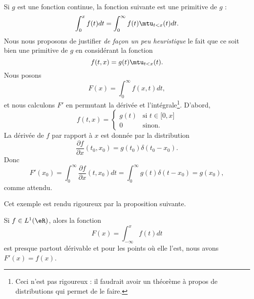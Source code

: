 \begin{example} \label{ExfYXeQg}
	Si \( g\) est une fonction continue, la fonction suivante est une primitive de \( g\) :
	\begin{equation}
		\int_0^xf(t)dt=\int_0^{\infty}f(t)\mtu_{t<x}(t)dt.
	\end{equation}
	Nous nous proposons de justifier \emph{de façon un peu heuristique} le fait que ce soit bien une primitive de \( g\) en considérant la fonction
	\begin{equation}
		f(t,x)=g(t)\mtu_{t<x}(t).
	\end{equation}
	Nous posons
	\begin{equation}
		F(x)=\int_0^{\infty}f(x,t)dt,
	\end{equation}
	et nous calculons \( F'\) en permutant la dérivée et l'intégrale\footnote{Ceci n'est pas rigoureux : il faudrait avoir un théorème à propos de distributions qui permet de le faire.}. D'abord,
	\begin{equation}
		f(t,x)=\begin{cases}
			g(t) & \text{si } t\in \mathopen[ 0 , x \mathclose] \\
			0    & \text{sinon.}
		\end{cases}
	\end{equation}
	La dérivée de \( f\) par rapport à \( x\) est donnée par la distribution
	\begin{equation}
		\frac{ \partial f }{ \partial x }(t_0,x_0)=g(t_0)\delta(t_0-x_0).
	\end{equation}
	Donc
	\begin{equation}
		F'(x_0)=\int_0^{\infty}\frac{ \partial f }{ \partial x }(t,x_0)dt=\int_0^{\infty}g(t)\delta(t-x_0)=g(x_0),
	\end{equation}
	comme attendu.
\end{example}

Cet exemple est rendu rigoureux par la proposition suivante.
\begin{proposition} \label{PropJLnPpaw}
	Si \( f\in L^1(\eR)\), alors la fonction
	\begin{equation}
		F(x)=\int_{-\infty}^xf(t)dt
	\end{equation}
	est presque partout dérivable et pour les points où elle l'est, nous avons \( F'(x)=f(x)\).
\end{proposition}

